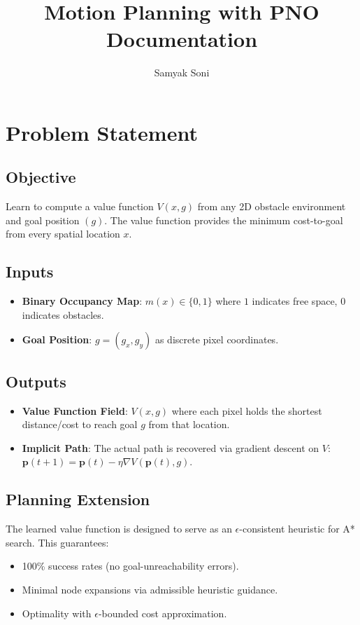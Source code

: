 \documentclass[11pt,a4paper]{article}
\title{Motion Planning with PNO\\Documentation}
\author{Samyak Soni}
\theoremstyle{definition}
\begin{document}
\maketitle
\tableofcontents
\newpage

\section{Problem Statement}\label{sec:problem}

\subsection{Objective}
Learn to compute a value function $V(x, g)$ from any 2D obstacle environment and goal position $(g)$.
The value function provides the minimum cost-to-goal from every spatial location $x$.

\subsection{Inputs}
\begin{itemize}
  \item \textbf{Binary Occupancy Map}: $m(x) \in \{0,1\}$ where $1$ indicates free space, $0$ indicates obstacles.
  \item \textbf{Goal Position}: $g = (g_x, g_y)$ as discrete pixel coordinates.
\end{itemize}

\subsection{Outputs}
\begin{itemize}
  \item \textbf{Value Function Field}: $V(x, g)$ where each pixel holds the shortest distance/cost to reach goal $g$ from that location.
  \item \textbf{Implicit Path}: The actual path is recovered via gradient descent on $V$: $\mathbf{p}(t+1) = \mathbf{p}(t) - \eta \nabla V(\mathbf{p}(t), g)$.
\end{itemize}

\subsection{Planning Extension}
The learned value function is designed to serve as an $\epsilon$-consistent heuristic for A* search.
This guarantees:
\begin{itemize}
  \item 100\% success rates (no goal-unreachability errors).
  \item Minimal node expansions via admissible heuristic guidance.
  \item Optimality with $\epsilon$-bounded cost approximation.
\end{itemize}
\end{document}
